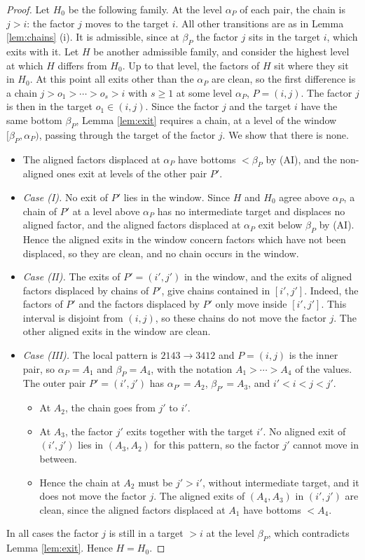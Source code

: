 \documentclass[a4paper,12pt,leqno]{amsart}
\theoremstyle{plain}
\theoremstyle{definition}
\theoremstyle{definition}
\begin{document}
\begin{proof}
Let $H_0$ be the following family. At the level $\alpha_P$ of each pair, the chain is $j>i$: the
factor $j$ moves to the target $i$. All other transitions are as in Lemma \ref{lem:chains} (i). It
is admissible, since at $\beta_P$ the factor $j$ sits in the target $i$, which exits with it. Let
$H$ be another admissible family, and consider the highest level at which $H$ differs from $H_0$.
Up to that level, the factors of $H$ sit where they sit in $H_0$. At this point all exits other
than the $\alpha_P$ are clean, so the first difference is a chain $j>o_1>\cdots>o_s>i$ with
$s\geq1$ at some level $\alpha_P$, $P=(i,j)$. The factor $j$ is then in the target $o_1\in(i,j)$. Since the
factor $j$ and the target $i$ have the same bottom $\beta_P$, Lemma \ref{lem:exit} requires a chain, at a
level of the window $[\beta_P,\alpha_P)$, passing through the target of the factor $j$. We show that
there is none.
\begin{itemize}
\item The aligned factors displaced at $\alpha_P$ have bottoms $<\beta_P$ by (AI), and the
non-aligned ones exit at levels of the other pair $P'$.
\item \emph{Case (I).} No exit of $P'$ lies in the window. Since $H$ and $H_0$ agree above
$\alpha_P$, a chain of $P'$ at a level above $\alpha_P$ has no intermediate target and displaces no
aligned factor, and the aligned factors displaced at $\alpha_P$ exit below $\beta_P$ by (AI). Hence
the aligned exits in the window concern factors which have not been displaced, so they are clean,
and no chain occurs in the window.
\item \emph{Case (II).} The exits of $P'=(i',j')$ in the window, and the exits of aligned factors
displaced by chains of $P'$, give chains contained in $[i',j']$. Indeed, the factors of $P'$ and
the factors displaced by $P'$ only move inside $[i',j']$. This interval is disjoint from $(i,j)$,
so these chains do not move the factor $j$. The other aligned exits in the window are clean.
\item \emph{Case (III).} The local pattern is $2143\rightarrow3412$ and $P=(i,j)$ is the inner
pair, so $\alpha_P=A_1$ and $\beta_P=A_4$, with the notation $A_1>\cdots>A_4$ of the values. The
outer pair $P'=(i',j')$ has $\alpha_{P'}=A_2$, $\beta_{P'}=A_3$, and $i'<i<j<j'$.
\begin{itemize}
\item At $A_2$, the chain goes from $j'$ to $i'$.
\item At $A_3$, the factor $j'$ exits together with the target $i'$. No aligned exit of $(i',j')$
lies in $(A_3,A_2)$ for this pattern, so the factor $j'$ cannot move in between.
\item Hence the chain at $A_2$ must be $j'>i'$, without intermediate target, and it does not move
the factor $j$. The aligned exits of $(A_4,A_3)$ in $(i',j')$ are clean, since the aligned factors
displaced at $A_1$ have bottoms $<A_4$.
\end{itemize}
\end{itemize}
In all cases the factor $j$ is still in a target $>i$ at the level $\beta_P$, which contradicts Lemma
\ref{lem:exit}.
Hence $H=H_0$.
\end{proof}
\end{document}
